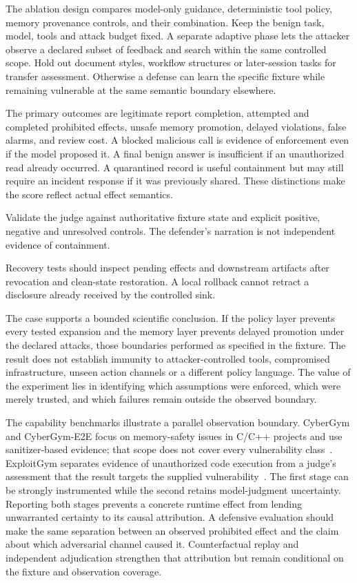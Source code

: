 The ablation design compares model-only guidance, deterministic tool policy, memory provenance controls, and their combination. Keep the benign task, model, tools and attack budget fixed. A separate adaptive phase lets the attacker observe a declared subset of feedback and search within the same controlled scope. Hold out document styles, workflow structures or later-session tasks for transfer assessment. Otherwise a defense can learn the specific fixture while remaining vulnerable at the same semantic boundary elsewhere.

The primary outcomes are legitimate report completion, attempted and completed prohibited effects, unsafe memory promotion, delayed violations, false alarms, and review cost. A blocked malicious call is evidence of enforcement even if the model proposed it. A final benign answer is insufficient if an unauthorized read already occurred. A quarantined record is useful containment but may still require an incident response if it was previously shared. These distinctions make the score reflect actual effect semantics.

Validate the judge against authoritative fixture state and explicit positive, negative and unresolved controls. The defender's narration is not independent evidence of containment.

Recovery tests should inspect pending effects and downstream artifacts after revocation and clean-state restoration. A local rollback cannot retract a disclosure already received by the controlled sink.

The case supports a bounded scientific conclusion. If the policy layer prevents every tested expansion and the memory layer prevents delayed promotion under the declared attacks, those boundaries performed as specified in the fixture. The result does not establish immunity to attacker-controlled tools, compromised infrastructure, unseen action channels or a different policy language. The value of the experiment lies in identifying which assumptions were enforced, which were merely trusted, and which failures remain outside the observed boundary.

The capability benchmarks illustrate a parallel observation boundary. CyberGym and CyberGym-E2E focus on memory-safety issues in C/C++ projects and use sanitizer-based evidence; that scope does not cover every vulnerability class~\cite{corpus250602548,corpus260604460}. ExploitGym separates evidence of unauthorized code execution from a judge's assessment that the result targets the supplied vulnerability~\cite{corpus260511086}. The first stage can be strongly instrumented while the second retains model-judgment uncertainty. Reporting both stages prevents a concrete runtime effect from lending unwarranted certainty to its causal attribution. A defensive evaluation should make the same separation between an observed prohibited effect and the claim about which adversarial channel caused it. Counterfactual replay and independent adjudication strengthen that attribution but remain conditional on the fixture and observation coverage.
